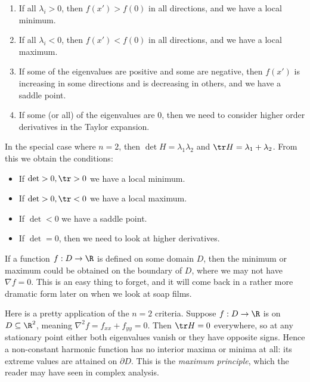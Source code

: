 \documentclass[a4paper]{scrartcl}
\begin{document}
\begin{enumerate}[label=(\roman*)]
	\item If all $\lambda_i > 0$, then $f(x') > f(0)$ in all directions, and we have a local minimum.
	\item If all $\lambda_i < 0$, then $f(x') < f(0)$ in all directions, and we have a local maximum.
	\item If some of the eigenvalues are positive and some are negative, then $f(x')$ is increasing in some directions and is decreasing in others, and we have a saddle point.
	\item If some (or all) of the eigenvalues are $0$, then we need to consider higher order derivatives in the Taylor expansion.
\end{enumerate}

In the special case where $n = 2$, then $\det H = \lambda_1 \lambda_2$ and $\tr H = \lambda_1 + \lambda_2$. From this we obtain the conditions:


\begin{itemize}
	\item If $\det > 0, \tr > 0$ we have a local minimum.
	\item If $\det > 0, \tr < 0$ we have a local maximum.
	\item If $\det < 0$ we have a saddle point.
	\item If $\det = 0$, then we need to look at higher derivatives.
\end{itemize}

\begin{remark}
	If a function $f: D \rightarrow \R$ is defined on some domain $D$, then the minimum or maximum could be obtained on the boundary of $D$, where we may not have $\nabla f = 0$.
	This is an easy thing to forget, and it will come back in a rather more dramatic form later on when we look at soap films.
\end{remark}

Here is a pretty application of the $n = 2$ criteria. Suppose $f: D \to \R$ is  on $D \subseteq \R^2$, meaning $\nabla^2 f = f_{xx} + f_{yy} = 0$. Then $\tr H = 0$ everywhere, so at any stationary point either both eigenvalues vanish or they have opposite signs. Hence a non-constant harmonic function has no interior maxima or minima at all: its extreme values are attained on $\partial D$. This is the \emph{maximum principle}, which the reader may have seen in complex analysis.
\end{document}
